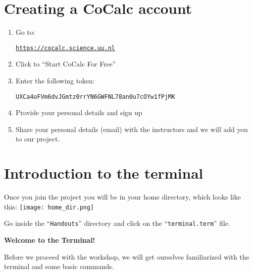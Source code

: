 \documentclass[11pt]{article}
\begin{document}
\section*{Creating a CoCalc account}

\begin{enumerate}
\item Go to:

\href{https://cocalc.science.uu.nl}{\texttt{https://cocalc.science.uu.nl}}

\item Click to ``Start CoCalc For Free''

\item Enter the following token:

\texttt{UXCa4oFVm6dvJGmtz0rrYN6GWFNL78an0u7cOYw1fPjMK}

\item Provide your personal details and sign up

\item Share your personal details (email) with the instructors and we will add you to our project. 

\end{enumerate}

\section*{Introduction to the terminal}

Once you join the project you will be in your home directory, which looks like this:
\texttt{[image: home\_dir.png]}

Go inside the ``\texttt{Handouts}'' directory and click on the ``\texttt{terminal.term}'' file. 

\textbf{Welcome to the Terminal!}

Before we proceed with the workshop, we will get ourselves familiarized with the terminal and some basic commands. 
\end{document}

